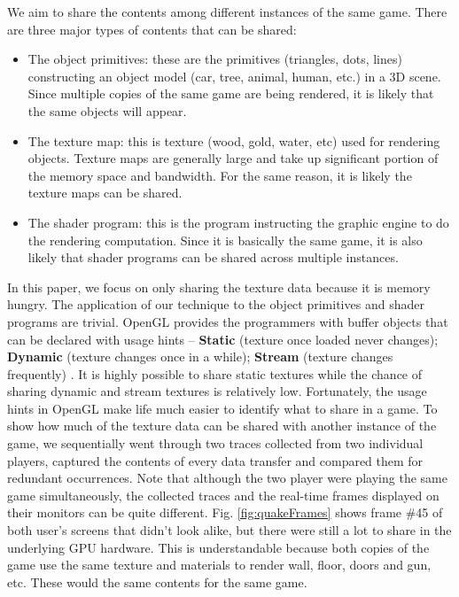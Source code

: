\documentclass[pageno]{jpaper}
\begin{document}
We aim to share the contents among different instances of the same game. There are three major types of contents that can be shared:
\begin{itemize}


\item {The object primitives: these are the primitives (triangles, dots, lines) constructing an object model (car, tree, animal, human, etc.) in a 3D scene. Since multiple copies of the same game are being rendered, it is likely that the same objects will appear.}
\item {The texture map: this is texture (wood, gold, water, etc) used for rendering objects. Texture maps are generally large and take up significant portion of the memory space and bandwidth. For the same reason, it is likely the texture maps can be shared.}
\item {The shader program: this is the program instructing the graphic engine to do the rendering computation. Since it is basically the same game, it is also likely that shader programs can be shared across multiple instances.}

\end{itemize}

 In this paper, we focus on only sharing the texture data because it is memory hungry. The application of our technique to the object primitives and shader programs are trivial. OpenGL provides the programmers with buffer objects that can be declared with usage hints -- \textbf{Static} (texture once loaded never changes); \textbf{Dynamic} (texture changes once in a while); \textbf{Stream} (texture changes frequently) \cite{oglhints}. It is highly possible to share static textures while the chance of sharing dynamic and stream textures is relatively low. Fortunately, the usage hints in OpenGL make life much easier to identify what to share in a game. To show how much of the texture data can be shared with another instance of the game, we sequentially went through two traces collected from two individual players, captured the contents of every data transfer and compared them for redundant occurrences. Note that although the two player were playing the same game simultaneously, the collected traces and the real-time frames displayed on their monitors can be quite different. Fig. \ref{fig:quakeFrames} shows frame \#45 of both user's screens that didn't look alike, but there were still a lot to share in the underlying GPU hardware. This is understandable because both copies of the game use the same texture and materials to render wall, floor, doors and gun, etc. These would the same contents for the same game.
\end{document}
